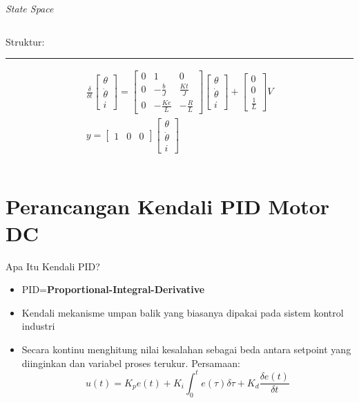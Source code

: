 \documentclass[10pt,xcolor={dvipsnames}]{beamer}
\begin{document}
\begin{frame}{\textit{State Space}}
\begin{columns}[T]
\begin{column}{0.5\textwidth}
			Struktur:\newline
			\color{myNewColorA}\rule{\linewidth}{4pt}
			\begin{equation}
				\begin{split}
					\frac{\delta}{\delta t}
					\begin{bmatrix}
						\theta \\ \dot{\theta} \\ i
					\end{bmatrix}
					=
					\begin{bmatrix}
						0 & 1 & 0\\
						0 & -\frac{b}{J} & \frac{Kt}{J}\\
						0 & -\frac{Ke}{L} & -\frac{R}{L}
					\end{bmatrix}
					\begin{bmatrix}
						\theta \\ \dot{\theta} \\ i
					\end{bmatrix}
					+
					\begin{bmatrix}
						0 \\ 0 \\ \frac{1}{L}
					\end{bmatrix}
					V\\
					y=
					\begin{bmatrix}
						1 & 0 & 0
					\end{bmatrix}
					\begin{bmatrix}
						\theta \\ \dot{\theta} \\ i
					\end{bmatrix}
				\end{split}
			\end{equation}
		\end{column}
	\end{columns}
\end{frame}

\section{Perancangan Kendali PID Motor DC}
\begin{frame}{Apa Itu Kendali PID?}
	\begin{itemize}
		\item PID=\textbf{Proportional-Integral-Derivative}
		\item Kendali mekanisme umpan balik yang biasanya dipakai pada sistem kontrol industri
		\item Secara kontinu menghitung nilai kesalahan sebagai beda antara setpoint yang diinginkan dan variabel proses terukur.
		Persamaan:
		\begin{equation}
			u(t)=K_{p}e(t)+K_{i}\int_{0}^{t}e(\tau)\delta\tau+K_{d}\frac{\delta e(t)}{\delta t}
		\end{equation}
	\end{itemize}
\end{frame}
\end{document}
